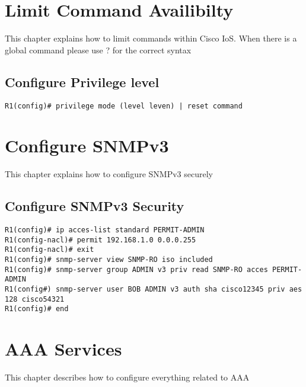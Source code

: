 \section{Limit Command Availibilty}
This chapter explains how to limit commands within Cisco IoS. 
When there is a global command please use ? for the correct syntax 

\subsection{Configure Privilege level}
\begin{verbatim}
R1(config)# privilege mode (level leven) | reset command 
\end{verbatim}

\section{Configure SNMPv3}
This chapter explains how to configure SNMPv3 securely

\subsection{Configure SNMPv3 Security}

\begin{verbatim}
R1(config)# ip acces-list standard PERMIT-ADMIN 
R1(config-nacl)# permit 192.168.1.0 0.0.0.255
R1(config-nacl)# exit
R1(config)# snmp-server view SNMP-RO iso included 
R1(config)# snmp-server group ADMIN v3 priv read SNMP-RO acces PERMIT-ADMIN
R1(config#) snmp-server user BOB ADMIN v3 auth sha cisco12345 priv aes 128 cisco54321
R1(config)# end 
\end{verbatim}

\section{AAA Services}
This chapter describes how to configure everything related to AAA

